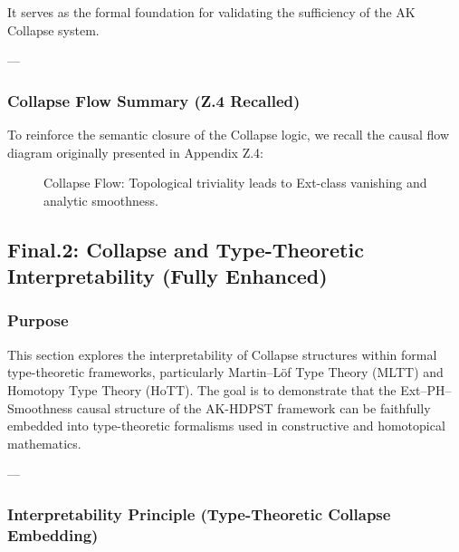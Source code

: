 \documentclass[11pt]{article}
\begin{document}
\begin{axiom}
\begin{axiom}
{{It serves as the formal foundation for validating the sufficiency of the AK Collapse system.

---

\subsubsection*{Collapse Flow Summary (Z.4 Recalled)}

To reinforce the semantic closure of the Collapse logic,  
we recall the causal flow diagram originally presented in Appendix Z.4:

\begin{figure}[H]
\centering
{}
\caption{Collapse Flow: Topological triviality leads to Ext-class vanishing and analytic smoothness.}
\end{figure}



\subsection*{Final.2: Collapse and Type-Theoretic Interpretability (Fully Enhanced)}

\subsubsection*{Purpose}

This section explores the interpretability of Collapse structures within formal type-theoretic frameworks,  
particularly Martin–Löf Type Theory (MLTT) and Homotopy Type Theory (HoTT).  
The goal is to demonstrate that the Ext–PH–Smoothness causal structure of the AK-HDPST framework  
can be faithfully embedded into type-theoretic formalisms used in constructive and homotopical mathematics.

---

\subsubsection*{Interpretability Principle (Type-Theoretic Collapse Embedding)}

}}
\end{axiom}
\end{axiom}
\end{document}
